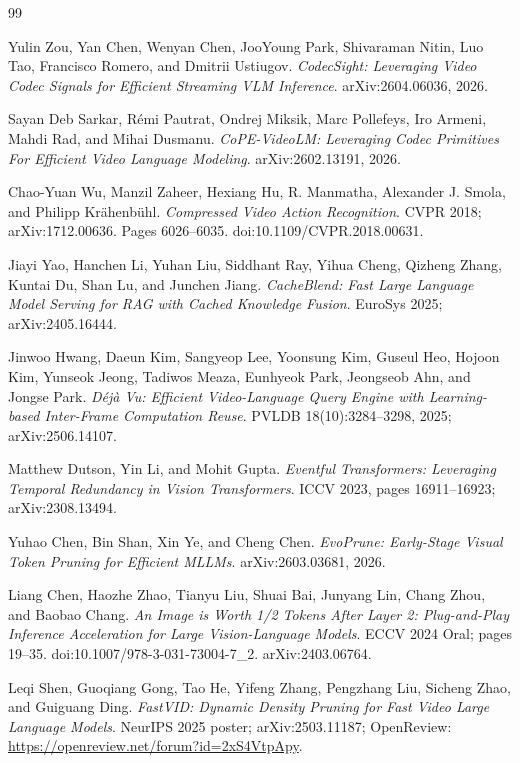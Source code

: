\begin{thebibliography}{99}

Yulin Zou, Yan Chen, Wenyan Chen, JooYoung Park, Shivaraman Nitin, Luo Tao,
Francisco Romero, and Dmitrii Ustiugov.
\emph{CodecSight: Leveraging Video Codec Signals for Efficient Streaming VLM
Inference}. arXiv:2604.06036, 2026.

Sayan Deb Sarkar, R\'emi Pautrat, Ondrej Miksik, Marc Pollefeys, Iro Armeni,
Mahdi Rad, and Mihai Dusmanu.
\emph{CoPE-VideoLM: Leveraging Codec Primitives For Efficient Video Language
Modeling}. arXiv:2602.13191, 2026.

Chao-Yuan Wu, Manzil Zaheer, Hexiang Hu, R. Manmatha, Alexander J. Smola, and
Philipp Kr\"ahenb\"uhl.
\emph{Compressed Video Action Recognition}. CVPR 2018; arXiv:1712.00636.
Pages 6026--6035. doi:10.1109/CVPR.2018.00631.

Jiayi Yao, Hanchen Li, Yuhan Liu, Siddhant Ray, Yihua Cheng, Qizheng Zhang,
Kuntai Du, Shan Lu, and Junchen Jiang.
\emph{CacheBlend: Fast Large Language Model Serving for RAG with Cached
Knowledge Fusion}. EuroSys 2025; arXiv:2405.16444.

Jinwoo Hwang, Daeun Kim, Sangyeop Lee, Yoonsung Kim, Guseul Heo, Hojoon Kim,
Yunseok Jeong, Tadiwos Meaza, Eunhyeok Park, Jeongseob Ahn, and Jongse Park.
\emph{D\'ej\`a Vu: Efficient Video-Language Query Engine with Learning-based
Inter-Frame Computation Reuse}. PVLDB 18(10):3284--3298, 2025;
arXiv:2506.14107.

Matthew Dutson, Yin Li, and Mohit Gupta.
\emph{Eventful Transformers: Leveraging Temporal Redundancy in Vision
Transformers}. ICCV 2023, pages 16911--16923; arXiv:2308.13494.

Yuhao Chen, Bin Shan, Xin Ye, and Cheng Chen.
\emph{EvoPrune: Early-Stage Visual Token Pruning for Efficient MLLMs}.
arXiv:2603.03681, 2026.

Liang Chen, Haozhe Zhao, Tianyu Liu, Shuai Bai, Junyang Lin, Chang Zhou, and
Baobao Chang.
\emph{An Image is Worth 1/2 Tokens After Layer 2: Plug-and-Play Inference
Acceleration for Large Vision-Language Models}. ECCV 2024 Oral;
pages 19--35. doi:10.1007/978-3-031-73004-7\_2. arXiv:2403.06764.

Leqi Shen, Guoqiang Gong, Tao He, Yifeng Zhang, Pengzhang Liu, Sicheng Zhao,
and Guiguang Ding.
\emph{FastVID: Dynamic Density Pruning for Fast Video Large Language Models}.
NeurIPS 2025 poster; arXiv:2503.11187; OpenReview:
\url{https://openreview.net/forum?id=2xS4VtpApy}.


\end{thebibliography}
